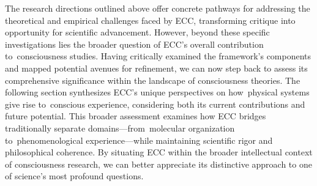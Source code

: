 The research directions outlined above offer concrete pathways for addressing the theoretical and empirical challenges faced by ECC, transforming critique into opportunity for scientific advancement. However, beyond these specific investigations lies the broader question of ECC's overall contribution to~consciousness studies. Having critically examined the framework's components and mapped potential avenues for refinement, we can now step back to assess its comprehensive significance within the landscape of consciousness theories. The following section synthesizes ECC's unique perspectives on how~physical systems give rise to~conscious experience, considering both its current contributions and future potential. This broader assessment examines how ECC bridges traditionally separate domains—from~molecular organization to~phenomenological experience—while maintaining scientific rigor and philosophical coherence. By situating ECC within the broader intellectual context of consciousness research, we can better appreciate its distinctive approach to one of science's most profound questions.

